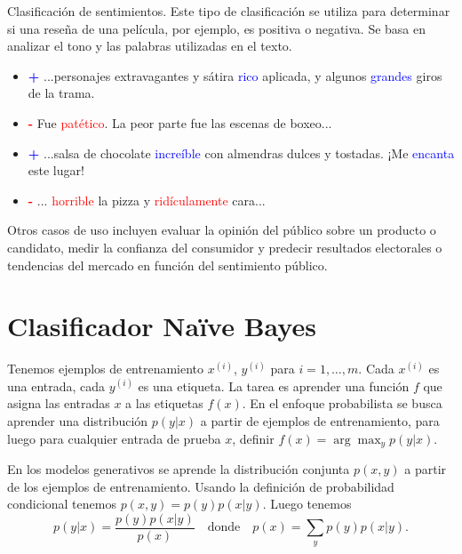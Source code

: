 \begin{example}
Clasificación de sentimientos.
Este tipo de clasificación se utiliza para determinar si una reseña de una película, por ejemplo, es positiva o negativa. Se basa en analizar el tono y las palabras utilizadas en el texto.



\begin{itemize}
    \item \textcolor{blue}{\textbf{+}} ...personajes extravagantes y sátira \textcolor{blue}{rico} aplicada, y algunos \textcolor{blue}{grandes} giros de la trama.
    \item \textcolor{red}{\textbf{-}} Fue \textcolor{red}{patético}. La peor parte fue las escenas de boxeo...
    \item \textcolor{blue}{\textbf{+}} ...salsa de chocolate \textcolor{blue}{increíble} con almendras dulces y tostadas. ¡Me \textcolor{blue}{encanta} este lugar!
    \item \textcolor{red}{\textbf{-}} ... \textcolor{red}{horrible} la pizza y \textcolor{red}{ridículamente} cara...
\end{itemize}

Otros casos de uso incluyen evaluar la opinión del público sobre un producto o candidato, medir la confianza del consumidor y predecir resultados electorales o tendencias del mercado en función del sentimiento público.
\end{example}



\section{Clasificador Naïve Bayes}
Tenemos ejemplos de entrenamiento $x^{(i)}$, $y^{(i)}$ para $i = 1, \ldots, m$. Cada $x^{(i)}$ es una entrada, cada $y^{(i)}$ es una etiqueta. La tarea es aprender una función $f$ que asigna las entradas $x$ a las etiquetas $f(x)$. En el enfoque probabilista se busca aprender una distribución $p(y|x)$ a partir de ejemplos de entrenamiento, para luego para cualquier entrada de prueba $x$, definir $f(x) = \arg \max_y p(y|x)$.
   
En los modelos generativos se aprende la distribución conjunta $p(x, y)$ a partir de los ejemplos de entrenamiento.
Usando la definición de probabilidad condicional tenemos $p(x, y) = p(y)p(x|y)$. Luego tenemos
        \[
        p(y|x) = \frac{p(y)p(x|y)}{p(x)} \quad \text{donde} \quad p(x) = \sum_y p(y)p(x|y).
        \]


